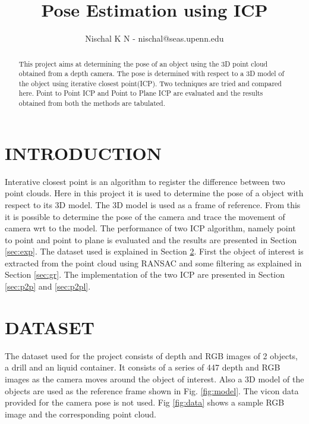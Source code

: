 \documentclass[letterpaper, 10 pt, conference]{ieeeconf}  %
\title{\LARGE \bf
Pose Estimation using ICP
}
\author{Nischal K N - nischal@seas.upenn.edu%
}
\begin{document}
\maketitle
\thispagestyle{empty}
\pagestyle{empty}


\begin{abstract}

This project aims at determining the pose of an object using the 3D point cloud obtained from a depth camera. The pose is determined with respect to a 3D model of the object using iterative closest point(ICP). Two techniques are tried and compared here. Point to Point ICP and Point to Plane ICP are evaluated and the results obtained from both the methods are tabulated.

\end{abstract}


\section{INTRODUCTION}
Interative closest point is an algorithm to register the difference between two point clouds. Here in this project it is used to determine the pose of a object with respect to its 3D model. The 3D model is used as a frame of reference. From this it is possible to determine the pose of the camera and trace the movement of camera wrt to the model. The performance of two ICP algorithm, namely point to point and point to plane is evaluated and the results are presented in Section \ref{sec:exp}. The dataset used is explained in Section \ref{sec:dataset}. First the object of interest is extracted from the point cloud using RANSAC and some filtering as explained in Section \ref{sec:gr}. The implementation of the two ICP are presented in Section \ref{sec:p2p} and \ref{sec:p2pl}.

\section{DATASET}
\label{sec:dataset}
The dataset used for the project consists of depth and RGB images of 2 objects, a drill and an liquid container. It consists of a series of 447 depth and RGB images as the camera moves around the object of interest. Also a 3D model of the objects are used as the reference frame shown in Fig. \ref{fig:model}. The vicon data provided for the camera pose is not used. Fig \ref{fig:data} shows a sample RGB image and the corresponding point cloud.
\end{document}
